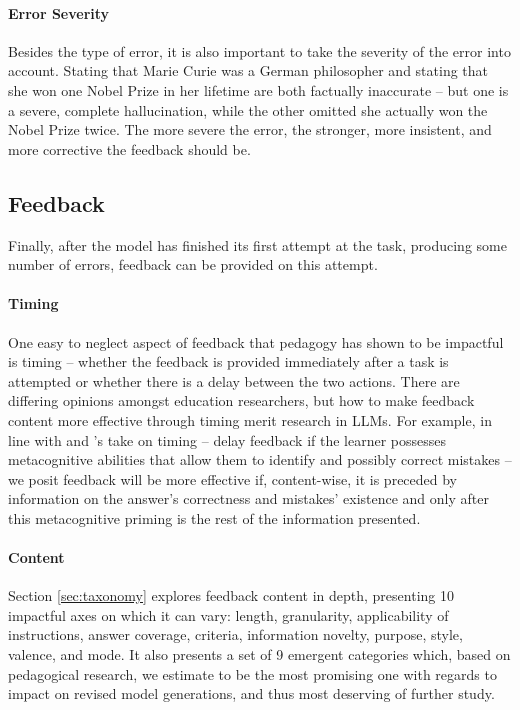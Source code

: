 \paragraph{Error Severity} Besides the type of error, it is also important to take the severity of the error into account. Stating that Marie Curie was a German philosopher and stating that she won one Nobel Prize in her lifetime are both factually inaccurate -- but one is a severe, complete hallucination, while the other omitted she actually won the Nobel Prize twice. The more severe the error, the stronger, more insistent, and more corrective the feedback should be.

\subsection{Feedback}
Finally, after the model has finished its first attempt at the task, producing some number of errors, feedback can be provided on this attempt.

\paragraph{Timing} One easy to neglect aspect of feedback that pedagogy has shown to be impactful is timing -- whether the feedback is provided immediately after a task is attempted or whether there is a delay between the two actions. There are differing opinions amongst education researchers, but how to make feedback content more effective through timing merit research in LLMs. For example, in line with \citet{Mathan2005FosteringTI} and \citet{narciss_feedback_2008}'s take on timing -- delay feedback if the learner possesses metacognitive abilities that allow them to identify and possibly correct mistakes -- we posit feedback will be more effective if, content-wise, it is preceded by information on the answer's correctness and mistakes' existence and only after this metacognitive priming is the rest of the information presented.

\paragraph{Content} Section \ref{sec:taxonomy} explores feedback content in depth, presenting 10 impactful axes on which it can vary: length, granularity, applicability of instructions, answer coverage, criteria, information novelty, purpose, style, valence, and mode. It also presents a set of 9 emergent categories which, based on pedagogical research, we estimate to be the most promising one with regards to impact on revised model generations, and thus most deserving of further study.


